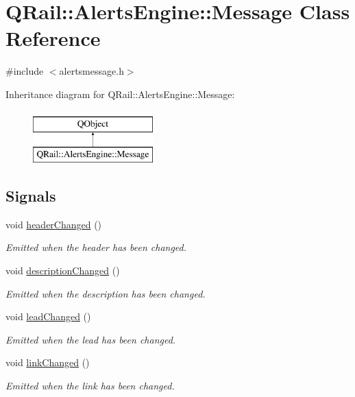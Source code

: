 \hypertarget{classQRail_1_1AlertsEngine_1_1Message}{}\section{Q\+Rail\+::Alerts\+Engine\+::Message Class Reference}
\label{classQRail_1_1AlertsEngine_1_1Message}


{\ttfamily \#include $<$alertsmessage.\+h$>$}

Inheritance diagram for Q\+Rail\+::Alerts\+Engine\+::Message\+:\begin{figure}[H]
\begin{center}
\leavevmode
\includegraphics[height=2.000000cm]{classQRail_1_1AlertsEngine_1_1Message}
\end{center}
\end{figure}
\subsection*{Signals}
\begin{DoxyCompactItemize}
\item 
void \mbox{\hyperlink{classQRail_1_1AlertsEngine_1_1Message_a682685d984964fe4f0bc6048fd11206d}{header\+Changed}} ()
\begin{DoxyCompactList}\small\item\em Emitted when the header has been changed. \end{DoxyCompactList}\item 
void \mbox{\hyperlink{classQRail_1_1AlertsEngine_1_1Message_a2558eb50cea5ae890fc68628e54ad9a0}{description\+Changed}} ()
\begin{DoxyCompactList}\small\item\em Emitted when the description has been changed. \end{DoxyCompactList}\item 
void \mbox{\hyperlink{classQRail_1_1AlertsEngine_1_1Message_a119795fc0c8d4c3b6d041844b83cf5ab}{lead\+Changed}} ()
\begin{DoxyCompactList}\small\item\em Emitted when the lead has been changed. \end{DoxyCompactList}\item 
void \mbox{\hyperlink{classQRail_1_1AlertsEngine_1_1Message_afccc9835aa7a6ec718a23cb5f8fbc73d}{link\+Changed}} ()
\begin{DoxyCompactList}\small\item\em Emitted when the link has been changed. \end{DoxyCompactList}\end{DoxyCompactItemize}
